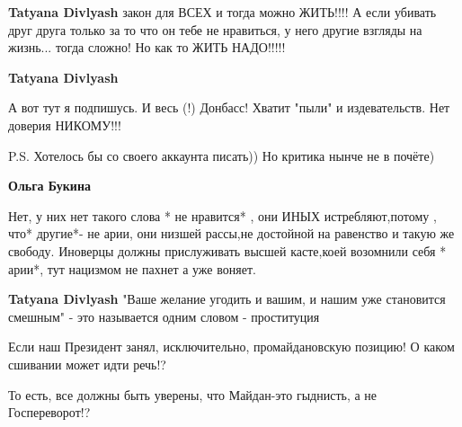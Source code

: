\begin{itemize}
\begin{itemize}
\textbf{Tatyana Divlyash} закон для ВСЕХ и тогда можно ЖИТЬ!!!! А если убивать
друг друга только за то что он тебе не нравиться, у него другие взгляды на
жизнь... тогда сложно! Но как то ЖИТЬ НАДО!!!!!

 
\textbf{Tatyana Divlyash} 

А вот тут я подпишусь. И весь (!) Донбасс! Хватит "пыли" и издевательств. Нет доверия НИКОМУ!!!

P.S. Хотелось бы со своего аккаунта писать)) Но критика нынче не в почёте)

 
\textbf{Ольга Букина} 

Нет, у них нет такого слова * не нравится* , они ИНЫХ истребляют,потому , что*
другие*- не арии, они низшей рассы,не достойной на равенство и такую же
свободу. Иноверцы должны прислуживать высшей касте,коей возомнили себя * арии*,
тут нацизмом не пахнет а уже воняет.


 
\textbf{Tatyana Divlyash} "Ваше желание угодить и вашим, и нашим уже становится смешным" - это называется одним словом - проституция

\end{itemize}

 

Если наш Президент занял, исключительно, промайдановскую позицию! О каком
сшивании может идти речь!?

То есть, все должны быть уверены, что Майдан-это гыднисть, а не Госпереворот!?


\end{itemize}
